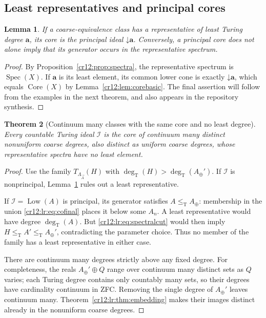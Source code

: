 \documentclass[11pt,letterpaper]{article}
\theoremstyle{plain}
\newtheorem{theorem}{Theorem}[section]
\newtheorem{lemma}[theorem]{Lemma}
\theoremstyle{definition}
\theoremstyle{remark}
\numberwithin{equation}{section}
\newcommand{\leT}{\leq_{\mathrm T}}
\newcommand{\Core}{\operatorname{Core}}
\newcommand{\Low}{\operatorname{Low}}
\newcommand{\Spec}{\operatorname{Spec}}
\newcommand{\degT}{\deg_{\mathrm T}}
\newcommand{\I}{\mathcal I}
\newcommand{\Aplus}{A_{\oplus}}          %
\newcommand{\Lam}{\Lambda_{\vec A}}      %
\newcommand{\down}{\mathord{\downarrow}}
\begin{document}
\subsection{Least representatives and principal cores}
\begin{lemma}\label{cr12:lr:lem:least}
If a coarse-equivalence class has a representative of least Turing degree $\mathbf a$,
its core is the principal ideal $\down\mathbf a$. Conversely, a principal core does not
alone imply that its generator occurs in the representative spectrum.
\end{lemma}
\begin{proof}
By Proposition~\ref{cr12:prop:spectra}, the representative spectrum is $\Spec(X)$. If
$\mathbf a$ is its least element, its common lower cone is exactly $\down\mathbf a$,
which equals $\Core(X)$ by Lemma~\ref{cr12:lem:corebasic}. The final assertion will
follow from the examples in the next theorem, and also appears in the repository
synthesis.
\end{proof}

\begin{theorem}[Continuum many classes with the same core and no least degree]\label{cr12:lr:thm:continuum}
Every countable Turing ideal $\I$ is the core of continuum many distinct nonuniform
coarse degrees, also distinct as uniform coarse degrees, whose representative spectra
have no least element.
\end{theorem}
\begin{proof}
Use the family $T_{\Lam}(H)$ with $\degT(H)>\degT(\Aplus')$. If $\I$ is nonprincipal,
Lemma~\ref{cr12:lr:lem:least} rules out a least representative.

If $\I=\Low(A)$ is principal, its generator satisfies $A\leT \Aplus$: membership in the
union \eqref{cr12:lr:eq:cofinal} places it below some $A_n$. A least representative
would have degree $\degT(A)$. But \eqref{cr12:lr:eq:spectralcut} would then imply
$H\leT A'\leT \Aplus'$, contradicting the parameter choice. Thus no member of the
family has a least representative in either case.

There are continuum many degrees strictly above any fixed degree. For completeness,
the reals $\Aplus'\oplus Q$ range over continuum many distinct sets as $Q$ varies; each
Turing degree contains only countably many sets, so their degrees have cardinality
continuum in ZFC. Removing the single degree of $\Aplus'$ leaves continuum many.
Theorem~\ref{cr12:lr:thm:embedding} makes their images distinct already in the
nonuniform coarse degrees.
\end{proof}
\end{document}
